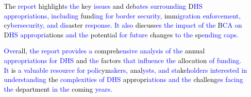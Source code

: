 \begin{tcolorbox}
    \textcolor{black}{The} \textcolor{blue}{report} \textcolor{black}{highlight}\textcolor{blue}{s} \textcolor{blue}{the} \textcolor{black}{key} \textcolor{blue}{issues} \textcolor{black}{and} \textcolor{black}{deb}\textcolor{blue}{ates} \textcolor{blue}{surrounding} \textcolor{black}{D}\textcolor{blue}{HS} \textcolor{blue}{appropri}\textcolor{blue}{ations}\textcolor{blue}{,} \textcolor{blue}{including} \textcolor{black}{fund}\textcolor{blue}{ing} \textcolor{blue}{for} \textcolor{blue}{border} \textcolor{blue}{security}\textcolor{blue}{,} \textcolor{black}{imm}\textcolor{blue}{igration} \textcolor{blue}{enfor}\textcolor{blue}{cement}\textcolor{blue}{,} \textcolor{black}{cy}\textcolor{blue}{ber}\textcolor{blue}{security}\textcolor{blue}{,} \textcolor{blue}{and} \textcolor{blue}{dis}\textcolor{black}{aster} \textcolor{blue}{response}\textcolor{blue}{.} \textcolor{blue}{It} \textcolor{blue}{also} \textcolor{black}{discuss}\textcolor{blue}{es} \textcolor{blue}{the} \textcolor{blue}{impact} \textcolor{blue}{of} \textcolor{blue}{the} \textcolor{black}{B}\textcolor{blue}{CA} \textcolor{blue}{on} \textcolor{black}{D}\textcolor{blue}{HS} \textcolor{blue}{appropri}\textcolor{black}{ations} \textcolor{blue}{and} \textcolor{blue}{the} \textcolor{black}{potential} \textcolor{blue}{for} \textcolor{blue}{future} \textcolor{black}{changes} \textcolor{blue}{to} \textcolor{blue}{the} \textcolor{black}{sp}\textcolor{blue}{ending} \textcolor{blue}{caps}\textcolor{blue}{.}
    
    \textcolor{blue}{Over}\textcolor{black}{all}\textcolor{blue}{,} \textcolor{blue}{the} \textcolor{blue}{report} \textcolor{blue}{provides} \textcolor{blue}{a} \textcolor{black}{compreh}\textcolor{blue}{ensive} \textcolor{blue}{analysis} \textcolor{blue}{of} \textcolor{blue}{the} \textcolor{black}{annual} \textcolor{blue}{appropri}\textcolor{blue}{ations} \textcolor{blue}{for} \textcolor{blue}{D}\textcolor{blue}{HS} \textcolor{black}{and} \textcolor{blue}{the} \textcolor{black}{factors} \textcolor{blue}{that} \textcolor{blue}{influence} \textcolor{blue}{the} \textcolor{black}{allocation} \textcolor{blue}{of} \textcolor{blue}{fund}\textcolor{blue}{ing}\textcolor{blue}{.} \textcolor{blue}{It} \textcolor{black}{is} \textcolor{blue}{a} \textcolor{blue}{valuable} \textcolor{blue}{resource} \textcolor{blue}{for} \textcolor{blue}{polic}\textcolor{black}{ym}\textcolor{blue}{akers}\textcolor{blue}{,} \textcolor{black}{anal}\textcolor{blue}{yst}\textcolor{blue}{s}\textcolor{blue}{,} \textcolor{blue}{and} \textcolor{blue}{st}\textcolor{black}{ake}\textcolor{blue}{hold}\textcolor{blue}{ers} \textcolor{blue}{interested} \textcolor{blue}{in} \textcolor{blue}{understanding} \textcolor{black}{the} \textcolor{blue}{complex}\textcolor{blue}{ities} \textcolor{blue}{of} \textcolor{blue}{D}\textcolor{blue}{HS} \textcolor{black}{appropri}\textcolor{blue}{ations} \textcolor{blue}{and} \textcolor{blue}{the} \textcolor{black}{challeng}\textcolor{blue}{es} \textcolor{blue}{facing} \textcolor{blue}{the} \textcolor{black}{department} \textcolor{blue}{in} \textcolor{blue}{the} \textcolor{black}{coming} \textcolor{blue}{years}\textcolor{blue}{.}

\end{tcolorbox}